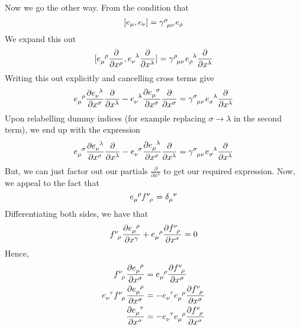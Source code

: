 \documentclass[11pt, a4paper]{article}   	%
\theoremstyle{slplain}
\begin{document}
Now we go the other way. From the condition that 
\[
	[ e_\mu, e_\nu ] = \gamma \indices{^\rho _{\mu \nu }} e_{ \rho } 
\] We expand this out 
\[
	[ e \indices{ _\mu^\rho} \frac{\partial }{\partial x^\rho}, e \indices{_\nu^\lambda} \frac{\partial }{\partial  x^\lambda} ] = \gamma \indices{ ^\rho_{ \mu \nu } } e \indices{ _ \rho ^ \lambda } \frac{\partial }{\partial x ^\lambda}        
 \] Writing this out explicitly and cancelling cross terms
 give 
 \[
  e \indices{ _ \mu ^ \rho } \frac{\partial e \indices{ _ \nu ^ \lambda }  }{\partial x ^ \sigma }  \frac{\partial }{\partial x ^ \lambda }  - e \indices{ _ \nu ^ \lambda } \frac{\partial e \indices{ _ \mu ^ \sigma }  }{\partial x ^ \sigma }  \frac{\partial }{\partial x ^ \sigma } = \gamma \indices{ ^ \sigma _{ \mu \nu } } e \indices{ _\sigma ^ \lambda } \frac{\partial }{\partial x ^ \lambda }      
 \] 
 Upon relabelling dummy indices (for example replacing $ \sigma \to \lambda $ in the second term), we end up 
 with the expression 
   \[
  e \indices{ _ \mu ^ \sigma } \frac{\partial  e \indices{ _ \nu ^ \lambda }  }{\partial  x^ \sigma  }\frac{\partial }{\partial x^ \lambda }  - e \indices{ _ \nu ^ \sigma } \frac{\partial  e \indices{ _ \mu ^ \lambda }  }{\partial x ^ \sigma }  \frac{\partial }{\partial  x^ \lambda } = \gamma \indices{ ^ \sigma _{ \mu \nu } } e \indices{ _ \sigma ^ \lambda } \frac{\partial }{\partial  x^ \lambda }     
\]  But, we can just factor out our partials $ \frac{\partial }{\partial  x^ \lambda } $ to get our required expression.  Now, we appeal to the fact that 
\[
e \indices{ _ \mu ^ \rho } f \indices{ ^ \nu _ \rho } = \delta \indices{ _ \mu ^ \nu }   
\] Differentiating both sides, we have that 
\[
f \indices{ ^ \nu _ \rho } \frac{\partial  e \indices{_ \mu ^ \rho }  }{\partial x^ \gamma }  + e \indices{ _ \mu ^ \rho } \frac{\partial f \indices{ ^ \nu _ \rho }   }{\partial x^ \sigma }  = 0   
\] Hence, 
\begin{align*}
  f \indices{ ^ \nu _ \rho } \frac{\partial e \indices{_ \mu ^ \rho }  }{\partial  x ^ \sigma 	 } &=  e \indices{ _ \mu ^ \rho } \frac{\partial f \indices{ ^ \nu _ \rho }  }{\partial x^ \sigma }   \\
  e \indices{ _ \nu ^ \tau } f \indices{ ^ \nu _ \rho } \frac{\partial  e \indices{_ \mu ^ \rho }  }{\partial x^ \sigma } &=  - e \indices{_ \nu ^ \tau } e \indices{ _ \mu ^ \rho } \frac{\partial f \indices{ ^ \nu _ \rho }  }{\partial x^ \sigma }     \\
  \frac{\partial  e \indices{ _ \mu ^ \tau }  }{\partial x^ \sigma  }  &=  - e \indices{_ \nu ^ \tau  } e \indices{ _ \mu ^ \rho } \frac{\partial  f \indices{ ^ \nu _ \rho }  }{\partial x^ \sigma }    \\ 
\end{align*}
\end{document}
